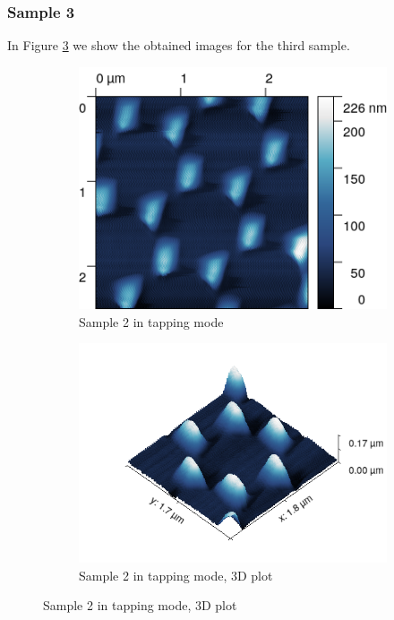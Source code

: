 \documentclass[11pt,a4paper]{article}
\begin{document}
\subsubsection{Sample 3}

In Figure \ref{fig:tapping_sample2} we show the obtained images for the third sample.

\begin{figure}[H]
\centering
\begin{subfigure}[b]{0.45\textwidth}
\includegraphics[width=\textwidth]{tm_sample2}
\caption{Sample 2 in tapping mode}
\label{fig:}
\end{subfigure}
\begin{subfigure}[b]{0.45\textwidth}
\includegraphics[width=\textwidth]{tm_sample2_3D}
\caption{Sample 2 in tapping mode, 3D plot}
\label{fig:tapping_sample2}
\end{subfigure}
\end{figure}
\end{document}
